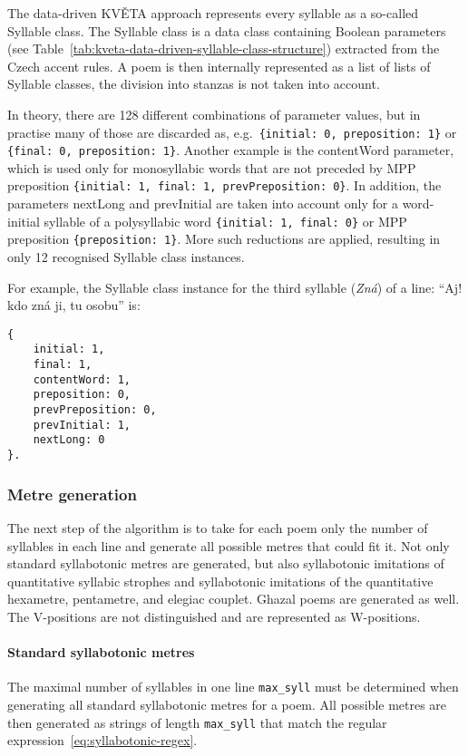 The data-driven KVĚTA approach represents every syllable as a so-called Syllable class. The Syllable class is a data class containing Boolean parameters (see Table~\ref{tab:kveta-data-driven-syllable-class-structure}) extracted from the Czech accent rules. A poem is then internally represented as a list of lists of Syllable classes, the division into stanzas is not taken into account.

In theory, there are 128 different combinations of parameter values, but in practise many of those are discarded as, e.g.~\verb|{initial: 0, preposition: 1}| or \verb|{final: 0, preposition: 1}|. Another example is the contentWord parameter, which is used only for monosyllabic words that are not preceded by MPP preposition \verb|{initial: 1, final: 1, prevPreposition: 0}|. In addition, the parameters nextLong and prevInitial are taken into account only for a word-initial syllable of a polysyllabic word \verb|{initial: 1, final: 0}| or MPP preposition \verb|{preposition: 1}|. More such reductions are applied, resulting in only 12 recognised Syllable class instances.

For example, the Syllable class instance for the third syllable (\emph{Zná}) of a line: \enquote{Aj! kdo zná ji, tu osobu} is:

\begin{verbatim}
{
    initial: 1,
    final: 1,
    contentWord: 1,
    preposition: 0,
    prevPreposition: 0,
    prevInitial: 1,
    nextLong: 0
}.
\end{verbatim}

\subsubsection{Metre generation}
The next step of the algorithm is to take for each poem only the number of syllables in each line and generate all possible metres that could fit it. Not only standard syllabotonic metres are generated, but also syllabotonic imitations of quantitative syllabic strophes and syllabotonic imitations of the quantitative hexametre, pentametre, and elegiac couplet. Ghazal poems are generated as well. The V-positions are not distinguished and are represented as W-positions.

\paragraph{Standard syllabotonic metres}
The maximal number of syllables in one line \verb|max_syll| must be determined when generating all standard syllabotonic metres for a poem. All possible metres are then generated as strings of length \verb|max_syll| that match the regular expression~\eqref{eq:syllabotonic-regex}.

